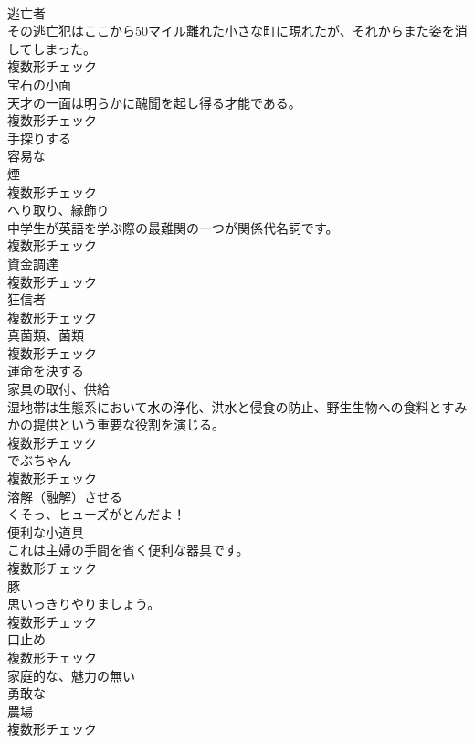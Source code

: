 \documentclass[8pt]{extreport}
\begin{document}
\begin{CJK}{UTF8}{min}
\\	[名詞]	逃亡者	
\\	その逃亡犯はここから50マイル離れた小さな町に現れたが、それからまた姿を消してしまった。	
\\	複数形チェック
\\	[名詞]	宝石の小面	
\\	天才の一面は明らかに醜聞を起し得る才能である。	
\\	複数形チェック
\\	[動詞]	手探りする	
\\	[形容詞]	容易な	
\\	[名詞]	煙	
\\	複数形チェック
\\	[名詞]	へり取り、縁飾り	
\\	中学生が英語を学ぶ際の最難関の一つが関係代名詞です。	
\\	複数形チェック
\\	[名詞]	資金調達	
\\	複数形チェック
\\	[名詞]	狂信者	
\\	複数形チェック
\\	[名詞]	真菌類、菌類	
\\	複数形チェック
\\	[形容詞]	運命を決する	
\\	[名詞]	家具の取付、供給	
\\	湿地帯は生態系において水の浄化、洪水と侵食の防止、野生生物への食料とすみかの提供という重要な役割を演じる。	
\\	複数形チェック
\\	[名詞]	でぶちゃん	
\\	複数形チェック
\\	[動詞]	溶解（融解）させる	
\\	くそっ、ヒューズがとんだよ！	
\\	[名詞]	便利な小道具	
\\	これは主婦の手間を省く便利な器具です。	
\\	複数形チェック
\\	[名詞]	豚	
\\	思いっきりやりましょう。	
\\	複数形チェック
\\	[名詞]	口止め	
\\	複数形チェック
\\	[形容詞]	家庭的な、魅力の無い	
\\	[形容詞]	勇敢な	
\\	[名詞]	農場	
\\	複数形チェック

\end{CJK}
\end{document}
